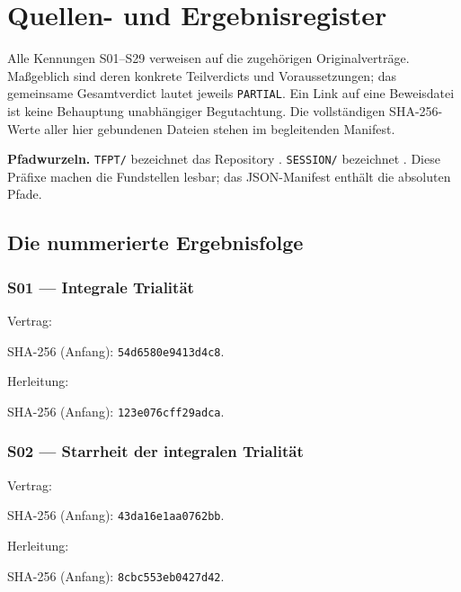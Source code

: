 \documentclass[11pt,a4paper,oneside,parskip=half,headings=normal,numbers=noenddot,bibliography=totoc]{scrreprt}
\begin{document}
\chapter{Quellen- und Ergebnisregister}
Alle Kennungen S01--S29 verweisen auf die zugehörigen Originalverträge. Maßgeblich sind deren konkrete Teilverdicts und Voraussetzungen; das gemeinsame Gesamtverdict lautet jeweils \texttt{PARTIAL}. Ein Link auf eine Beweisdatei ist keine Behauptung unabhängiger Begutachtung. Die vollständigen SHA-256-Werte aller hier gebundenen Dateien stehen im begleitenden Manifest.

\textbf{Pfadwurzeln.} \texttt{TFPT/} bezeichnet das Repository . \texttt{SESSION/} bezeichnet . Diese Präfixe machen die Fundstellen lesbar; das JSON-Manifest enthält die absoluten Pfade.

\section{Die nummerierte Ergebnisfolge}
\subsection*{S01 — Integrale Trialität}\label{s:01}
{\small{}\par}
Vertrag: \par{\footnotesize SHA-256 (Anfang): \texttt{54d6580e9413d4c8}.}\par
Herleitung: \par{\footnotesize SHA-256 (Anfang): \texttt{123e076cff29adca}.}\par
\subsection*{S02 — Starrheit der integralen Trialität}\label{s:02}
{\small{}\par}
Vertrag: \par{\footnotesize SHA-256 (Anfang): \texttt{43da16e1aa0762bb}.}\par
Herleitung: \par{\footnotesize SHA-256 (Anfang): \texttt{8cbc553eb0427d42}.}\par
\end{document}
